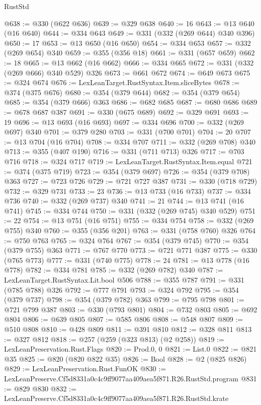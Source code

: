 \begin{lexlean}{RustStd}
\begin{coremodule}
@638 := @330 (@622 @636)
@639 := @329 @638
@640 := 16
@643 := @13 @640 (@16 @640)
@644 := @334 @643
@649 := @331 (@332 (@269 @644) @340 @396)
@650 := 17
@653 := @13 @650 (@16 @650)
@654 := @334 @653
@657 := @332 (@269 @654) @340
@659 := @355 (@356 @18)
@661 := @331 (@657 @659)
@662 := 18
@665 := @13 @662 (@16 @662)
@666 := @334 @665
@672 := @331 (@332 (@269 @666) @340 @529) @326
@673 := @661 @672
@674 := @649 @673
@675 := @324 @674
@676 := LexLeanTarget.RustSyntax.Item.sliceBytes
@678 := @374 (@375 @676)
@680 := @354 (@379 @644)
@682 := @354 (@379 @654)
@685 := @354 (@379 @666) @363
@686 := @682 @685
@687 := @680 @686
@689 := @678 @687 @387
@691 := @330 (@675 @689)
@692 := @329 @691
@693 := 19
@696 := @13 @693 (@16 @693)
@697 := @334 @696
@700 := @332 (@269 @697) @340
@701 := @379 @280
@703 := @331 (@700 @701)
@704 := 20
@707 := @13 @704 (@16 @704)
@708 := @334 @707
@711 := @332 (@269 @708) @340
@713 := @355 (@407 @190)
@716 := @331 (@711 @713) @326
@717 := @703 @716
@718 := @324 @717
@719 := LexLeanTarget.RustSyntax.Item.equal
@721 := @374 (@375 @719)
@723 := @354 (@379 @697)
@726 := @354 (@379 @708) @363
@727 := @723 @726
@729 := @721 @727 @387
@731 := @330 (@718 @729)
@732 := @329 @731
@733 := 23
@736 := @13 @733 (@16 @733)
@737 := @334 @736
@740 := @332 (@269 @737) @340
@741 := 21
@744 := @13 @741 (@16 @741)
@745 := @334 @744
@750 := @331 (@332 (@269 @745) @340 @529)
@751 := 22
@754 := @13 @751 (@16 @751)
@755 := @334 @754
@758 := @332 (@269 @755) @340
@760 := @355 (@356 @201)
@763 := @331 (@758 @760) @326
@764 := @750 @763
@765 := @324 @764
@767 := @354 (@379 @745)
@770 := @354 (@379 @755) @363
@771 := @767 @770
@773 := @721 @771 @387
@775 := @330 (@765 @773)
@777 := @331 (@740 @775)
@778 := 24
@781 := @13 @778 (@16 @778)
@782 := @334 @781
@785 := @332 (@269 @782) @340
@787 := LexLeanTarget.RustSyntax.Lit.bool @506
@788 := @355 @787
@791 := @331 (@785 @788) @326
@792 := @777 @791
@793 := @324 @792
@795 := @354 (@379 @737)
@798 := @354 (@379 @782) @363
@799 := @795 @798
@801 := @721 @799 @387
@803 := @330 (@793 @801)
@804 := @732 @803
@805 := @692 @804
@806 := @639 @805
@807 := @585 @806
@808 := @548 @807
@809 := @510 @808
@810 := @428 @809
@811 := @391 @810
@812 := @328 @811
@813 := @327 @812
@818 := @257 (@259 (@323 @813) (@2 @258))
@819 := LexLeanPreservation.Rust.Flags
@820 := Prod.{0, 0}
@821 := List.{0}
@822 := @821 @35
@825 := @820 (@820 @822 @35)
@826 := Bool
@828 := @2 (@825 @826)
@829 := LexLeanPreservation.Rust.FunOK
@830 := LexLeanPreserve.Cf5d8331a0c4c9ff9077aa409aea5f871.R26.RustStd.program
@831 := @829 @830
@832 := LexLeanPreserve.Cf5d8331a0c4c9ff9077aa409aea5f871.R26.RustStd.krate

\end{coremodule}
\end{lexlean}
